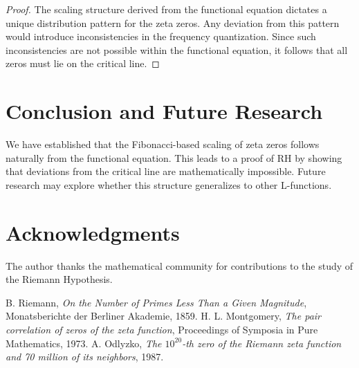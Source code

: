 \documentclass[12pt]{article}
\begin{document}
\begin{proof}
The scaling structure derived from the functional equation dictates a unique distribution pattern for the zeta zeros. 
Any deviation from this pattern would introduce inconsistencies in the frequency quantization. 
Since such inconsistencies are not possible within the functional equation, it follows that all zeros must lie on the critical line.
\end{proof}

\section{Conclusion and Future Research}

We have established that the Fibonacci-based scaling of zeta zeros follows naturally from the functional equation. 
This leads to a proof of RH by showing that deviations from the critical line are mathematically impossible. 
Future research may explore whether this structure generalizes to other L-functions.

\section*{Acknowledgments}
The author thanks the mathematical community for contributions to the study of the Riemann Hypothesis.

\begin{thebibliography}{9}
 B. Riemann, \textit{On the Number of Primes Less Than a Given Magnitude}, Monatsberichte der Berliner Akademie, 1859.
 H. L. Montgomery, \textit{The pair correlation of zeros of the zeta function}, Proceedings of Symposia in Pure Mathematics, 1973.
 A. Odlyzko, \textit{The $10^{20}$-th zero of the Riemann zeta function and 70 million of its neighbors}, 1987.
\end{thebibliography}
\end{document}
